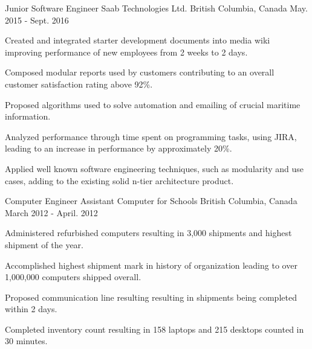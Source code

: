

\begin{cventries}

  \cventry
    {Junior Software Engineer} %
    {Saab Technologies Ltd.} %
    {British Columbia, Canada} %
    {May. 2015 - Sept. 2016} %
    {
      \begin{cvitems} %
        \item {Created and integrated starter development documents into media wiki improving performance of new employees from 2 weeks to 2 days.}
        \item {Composed modular reports used by customers contributing to an overall customer satisfaction rating above 92\%.}
        \item {Proposed algorithms used to solve automation and emailing of crucial maritime information.}
        \item {Analyzed performance through time spent on programming tasks, using JIRA, leading to an increase in performance by approximately 20\%.}
        \item {Applied well known software engineering techniques, such as modularity and use cases, adding to the existing solid n-tier architecture product.}
      \end{cvitems}
    }

  \cventry
    {Computer Engineer Assistant} %
    {Computer for Schools} %
    {British Columbia, Canada} %
    {March 2012 - April. 2012} %
    {
      \begin{cvitems} %
        \item {Administered refurbished computers resulting in 3,000 shipments and highest shipment of the year.}
        \item {Accomplished highest shipment mark in history of organization leading to over 1,000,000 computers shipped overall.}
        \item {Proposed communication line resulting resulting in shipments being completed within 2 days.}
        \item {Completed inventory count resulting in 158 laptops and 215 desktops counted in 30 minutes.}
      \end{cvitems}
    }
\end{cventries}
